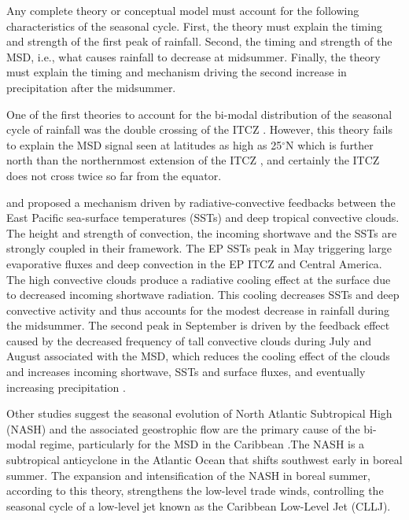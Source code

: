 Any complete theory or conceptual model must account for the following characteristics of the seasonal cycle. First, the theory must explain the timing and strength of the first peak of rainfall. Second, the timing and strength of the MSD, i.e., what causes rainfall to decrease at midsummer. Finally, the theory must explain the timing and mechanism driving the second increase in precipitation after the midsummer. %

One of the first theories to account for the bi-modal distribution of the seasonal cycle of rainfall was the double crossing of the ITCZ \citep{hastenrath1967}. 
However, this theory fails to explain the MSD signal seen at latitudes as high as 25$^\circ$N \citep{perdigon2018,zhao2020} which is further north than the northernmost extension of the ITCZ \citep{schneider2014}, and certainly the ITCZ does not cross twice so far from the equator. %

\cite{magana1999} and \cite{magana2005} proposed a mechanism driven by radiative-convective feedbacks between the East Pacific sea-surface temperatures (SSTs) and deep tropical convective clouds. The height and strength of convection, the incoming shortwave and the SSTs are strongly coupled in their framework. %
The EP SSTs peak in May triggering large evaporative fluxes and deep convection in the EP ITCZ and Central America.
The high convective clouds produce a radiative cooling effect at the surface due to decreased incoming shortwave radiation.
This cooling  decreases SSTs and deep convective activity and thus accounts for the modest decrease in rainfall during the midsummer.
The second peak in September is driven by the feedback effect caused by the decreased frequency of tall convective clouds during July and August associated with the MSD, which reduces the cooling effect of the clouds and increases incoming shortwave, SSTs and surface fluxes, and eventually increasing precipitation \citep{magana1999}.



 Other studies suggest the seasonal evolution of North Atlantic Subtropical High (NASH) and the associated geostrophic flow are the primary cause of the bi-modal regime, particularly for the MSD in the Caribbean  \citep[e.g.][]{mapes2005,gamble2008,curtis2008}.The NASH is a subtropical anticyclone in the Atlantic Ocean that shifts southwest early in boreal summer. The expansion and intensification of the NASH in boreal summer, according to this theory, strengthens the low-level trade winds, controlling the seasonal cycle of a low-level jet known as the Caribbean Low-Level Jet (CLLJ). 
 
